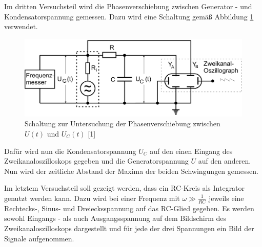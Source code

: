 Im dritten Versuchsteil wird die Phasenverschiebung zwischen Generator - und 
Kondensatorspannung gemessen. Dazu wird eine Schaltung gemäß Abbildung \ref{fig:aufbau3}
verwendet. 

\begin{figure}
\centering
\includegraphics[scale=0.2]{content/aufbau3.png}
\caption{Schaltung zur Untersuchung der Phasenverschiebung zwischen $U(t)$ und $U_C(t)$ [1]}
\label{fig:aufbau3}
\end{figure}

Dafür wird nun die Kondensatorspannung $U_C$ auf den einen Eingang des 
Zweikanaloszilloskops gegeben und die Generatorspannung $U$ auf den anderen. 
Nun wird der zeitliche Abstand der Maxima der beiden Schwingungen gemessen. 

Im letztem Versuchsteil soll gezeigt werden, dass ein RC-Kreis als Integrator 
genutzt werden kann. Dazu wird bei einer Frequenz mit $\omega \gg \frac{1}{RC}$ 
jeweils eine Rechtecks-, Sinus- und Dreiecksspannung auf das RC-Glied gegeben. 
Es werden sowohl Eingangs - als auch Ausgangsspannung auf dem Bildschirm des 
Zweikanaloszilloskops dargestellt und für jede der drei Spannungen ein Bild der 
Signale aufgenommen. 


